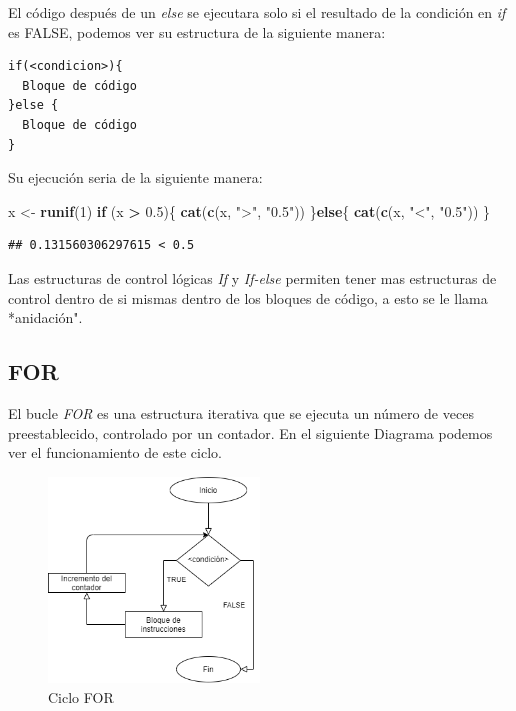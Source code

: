 \documentclass[11pt,]{article}
\newenvironment{Shaded}{\begin{snugshade}}{\end{snugshade}}
\newcommand{\ControlFlowTok}[1]{\textcolor[rgb]{0.13,0.29,0.53}{\textbf{#1}}}
\newcommand{\DecValTok}[1]{\textcolor[rgb]{0.00,0.00,0.81}{#1}}
\newcommand{\FloatTok}[1]{\textcolor[rgb]{0.00,0.00,0.81}{#1}}
\newcommand{\KeywordTok}[1]{\textcolor[rgb]{0.13,0.29,0.53}{\textbf{#1}}}
\newcommand{\NormalTok}[1]{#1}
\newcommand{\OperatorTok}[1]{\textcolor[rgb]{0.81,0.36,0.00}{\textbf{#1}}}
\newcommand{\StringTok}[1]{\textcolor[rgb]{0.31,0.60,0.02}{#1}}
\begin{document}
El código después de un \emph{else} se ejecutara solo si el resultado de
la condición en \emph{if} es FALSE, podemos ver su estructura de la
siguiente manera:

\begin{verbatim}
if(<condicion>){
  Bloque de código
}else {
  Bloque de código
}
\end{verbatim}

Su ejecución seria de la siguiente manera:

\begin{Shaded}
\begin{Highlighting}[]
\NormalTok{x <-}\StringTok{ }\KeywordTok{runif}\NormalTok{(}\DecValTok{1}\NormalTok{)}
\ControlFlowTok{if}\NormalTok{ (x }\OperatorTok{>}\StringTok{ }\FloatTok{0.5}\NormalTok{)\{}
  \KeywordTok{cat}\NormalTok{(}\KeywordTok{c}\NormalTok{(x, }\StringTok{">"}\NormalTok{, }\StringTok{"0.5"}\NormalTok{))}
\NormalTok{\}}\ControlFlowTok{else}\NormalTok{\{}
  \KeywordTok{cat}\NormalTok{(}\KeywordTok{c}\NormalTok{(x, }\StringTok{"<"}\NormalTok{, }\StringTok{"0.5"}\NormalTok{))}
\NormalTok{\}}
\end{Highlighting}
\end{Shaded}

\begin{verbatim}
## 0.131560306297615 < 0.5
\end{verbatim}

Las estructuras de control lógicas \emph{If} y \emph{If-else} permiten
tener mas estructuras de control dentro de si mismas dentro de los
bloques de código, a esto se le llama *anidación".

\hypertarget{for}{%
\subsection{FOR}\label{for}}

El bucle \emph{FOR} es una estructura iterativa que se ejecuta un número
de veces preestablecido, controlado por un contador. En el siguiente
Diagrama podemos ver el funcionamiento de este ciclo.

\begin{figure}
\hypertarget{id}{%
\centering
\includegraphics[width=0.5\textwidth,height=0.3\textheight]{../schemas/FOR.png}
\caption{Ciclo FOR}\label{id}
}
\end{figure}
\end{document}
